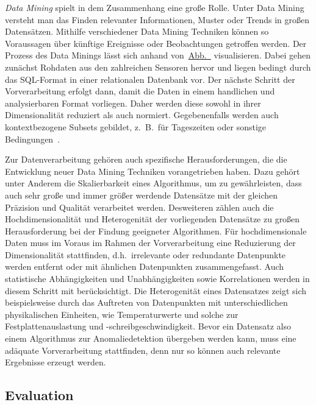 \textit{Data Mining} spielt in dem Zusammenhang eine große Rolle. Unter Data Mining versteht man das Finden relevanter Informationen,
Muster oder Trends in großen Datensätzen. Mithilfe verschiedener Data Mining Techniken können so Voraussagen über künftige Ereignisse oder
Beobachtungen getroffen werden. Der Prozess des Data Minings lässt sich anhand von~\hyperref[fig:data_mining]{Abb.~}
visualisieren. Dabei gehen zunächst Rohdaten aus den zahlreichen Sensoren hervor und liegen bedingt durch das SQL-Format in einer
relationalen Datenbank vor. Der nächste Schritt der Vorverarbeitung erfolgt dann, damit die Daten in einem handlichen und analysierbaren
Format vorliegen. Daher werden diese sowohl in ihrer Dimensionalität reduziert als auch normiert. Gegebenenfalls werden auch
kontextbezogene Subsets gebildet, z.~B.~für Tageszeiten oder sonstige Bedingungen~\Cite[Kap.~1]{Tan2014}.

Zur Datenverarbeitung gehören auch spezifische Herausforderungen, die die Entwicklung neuer Data Mining Techniken vorangetrieben haben.
Dazu gehört unter Anderem die Skalierbarkeit eines Algorithmus, um zu gewährleisten, dass auch sehr große und immer größer werdende
Datensätze mit der gleichen Präzision und Qualität verarbeitet werden. Desweiteren zählen auch die Hochdimensionalität und Heterogenität
der vorliegenden Datensätze zu großen Herausforderung bei der Findung geeigneter Algorithmen. Für hochdimensionale Daten muss im Voraus
im Rahmen der Vorverarbeitung eine Reduzierung der Dimensionalität stattfinden, d.h.~irrelevante oder redundante Datenpunkte werden
entfernt oder mit ähnlichen Datenpunkten zusammengefasst. Auch statistische Abhängigkeiten und Unabhängigkeiten sowie Korrelationen
werden in diesem Schritt mit berücksichtigt. Die Heterogenität eines Datensatzes zeigt sich beispielsweise durch das Auftreten von
Datenpunkten mit unterschiedlichen physikalischen Einheiten, wie Temperaturwerte und solche zur Festplattenauslastung und
-schreibgeschwindigkeit. Bevor ein Datensatz also einem Algorithmus zur Anomaliedetektion übergeben werden kann, muss eine adäquate
Vorverarbeitung stattfinden, denn nur so können auch relevante Ergebnisse erzeugt werden.


\newpage
\subsection{Evaluation}
